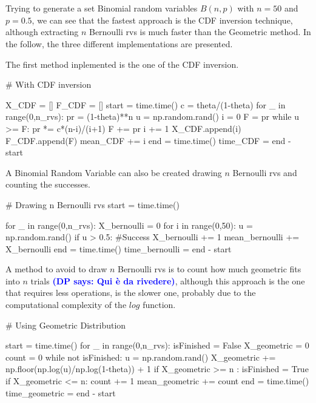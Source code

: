 \documentclass[11pt,a4paper]{article}
\newcommand{\DP}[1]{\textcolor{blue}{\textbf{(DP says: #1)}}}
\begin{document}
\newpage
\section{}
Trying to generate a set Binomial random variables $B(n,p)$ with $n=50$ and $p=0.5$, we can see that the fastest approach is the CDF inversion technique, although extracting $n$ Bernoulli rvs is much faster than the Geometric method.
In the follow, the three different implementations are presented.

The first method inplemented is the one of the CDF inversion.
\begin{python}
  # With CDF inversion

X_CDF = []
F_CDF = []
start = time.time()
c = theta/(1-theta)
for _ in range(0,n_rvs):
    pr = (1-theta)**n
    u = np.random.rand()
    i = 0
    F = pr
    while u >= F:
        pr *= c*(n-i)/(i+1)
        F += pr
        i += 1
    X_CDF.append(i)
    F_CDF.append(F)
    mean_CDF += i
end = time.time()
time_CDF = end - start
\end{python}

A Binomial Random Variable can also be created drawing $n$ Bernoulli rvs and counting the successes.
\begin{python}
  # Drawing n Bernoulli rvs
start = time.time()

for _ in range(0,n_rvs):
    X_bernoulli = 0
    for i in range(0,50):
        u = np.random.rand()
        if u > 0.5: #Success
            X_bernoulli += 1
    mean_bernoulli += X_bernoulli
end = time.time()
time_bernoulli = end - start
\end{python}

A method to avoid to draw $n$ Bernoulli rvs is to count how much geometric fits into $n$ trials
\DP{Qui è da rivedere}, although this approach is the one that requires less operations, is the slower one, probably due to the computational complexity of the $log$ function.

\begin{python}
  # Using Geometric Distribution

start = time.time()
for _ in range(0,n_rvs):
    isFinished = False
    X_geometric = 0
    count = 0
    while not isFinished:
        u = np.random.rand()
        X_geometric += np.floor(np.log(u)/np.log(1-theta)) + 1
        if X_geometric >= n :
            isFinished = True
        if X_geometric <= n:
            count += 1
    mean_geometric += count
end = time.time()
time_geometric = end - start
\end{python}
\end{document}
